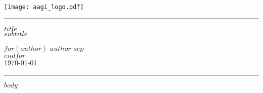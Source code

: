 \documentclass{scrartcl}
\begin{document}
	
	\begin{titlepage}
		
		\thispagestyle{Title_page}
		
		\vspace*{-2cm}
		
		\begin{center}
			\texttt{[image: aagi\_logo.pdf]}
		\end{center}
		
		\vfill
		
		\rule{\textwidth}{0.5pt}
		
		\begin{FlushRight}
			
			\huge
			\textcolor{aagiteal}{\textbf{$title$}}\\[6mm]
			
			\large
			{\textbf{$subtitle$}}\\[5mm]
			\vspace{2mm}
			
			\normalsize
			$for(author)$
			$author$
			$sep$ \\[8mm]
			$endfor$\\[8mm]

    		\today
  \end{FlushRight}

  \rule{\textwidth}{0.5pt}

  \vfill
		
	\end{titlepage}
	
	\newpage
	
	$body$
	
\end{document}
